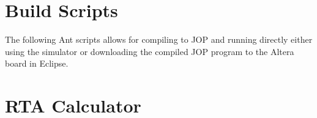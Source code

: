 \chapter{Build Scripts} %
\label{cha:build_scripts}
The following Ant scripts allows for compiling to JOP and running directly either using the simulator or downloading the compiled JOP program to the Altera board in Eclipse.




\chapter{RTA Calculator} %
\label{cha:rta_calculator}

